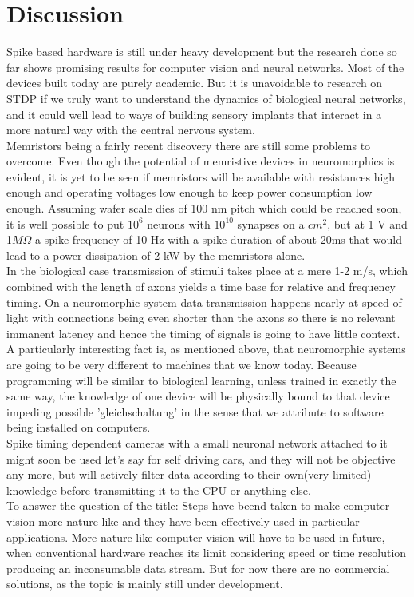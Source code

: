 \documentclass{SeminarV2}
\begin{document}
\section{Discussion}
Spike based hardware is still under heavy development but the research done so far shows promising results for computer vision and neural networks. Most of the devices built today are purely academic. 
But it is unavoidable to research on STDP if we truly want to understand the dynamics of biological neural networks, and it could well lead to ways of building sensory implants that interact in a more natural way with the central nervous system.\\
Memristors being a fairly recent discovery there are still some problems to overcome. Even though the potential of memristive devices in neuromorphics is evident, it is yet to be seen if memristors will be available with resistances high enough and operating voltages low enough to keep power consumption low enough. Assuming wafer scale dies of 100 nm pitch which could be reached soon, it is well possible to put $10^6$ neurons with $10^10$ synapses on a $cm^2$, but at 1 V and 1$M\Omega$ a spike frequency of 10 Hz with a spike duration of about 20ms that would lead to a power dissipation of 2 kW by the memristors alone.\\
In the biological case transmission of stimuli takes place at a mere 1-2 m/s, which combined with the length of axons yields a time base for relative and frequency timing. On a neuromorphic system data transmission happens nearly at speed of light with connections being even shorter than the axons so there is no relevant immanent latency and hence the timing of signals is going to have little context.\\
A particularly interesting fact is, as mentioned above, that neuromorphic systems are going to be very different to machines that we know today. Because programming will be similar to biological learning, unless trained in exactly the same way, the knowledge of one device will be physically bound to that device impeding possible 'gleichschaltung' in the sense that we attribute to software being installed on computers.\\
Spike timing dependent cameras with a small neuronal network attached to it might soon be used let's say for self driving cars, and they will not be objective any more, but will actively filter data according to their own(very limited) knowledge before transmitting it to the CPU or anything else.\\
To answer the question of the title: Steps have beend taken to make computer vision more nature like and they have been effectively used in particular applications. More nature like computer vision will have to be used in future, when conventional hardware reaches its limit considering speed or time resolution producing an inconsumable data stream. But for now there are no commercial solutions, as the topic is mainly still under development.
\iffalse
there are 10e11 neurons in the human brain, each having up to 15.000 synapses thus 10e15 synapses which is equivalent to petabyte
\fi
\end{document}
